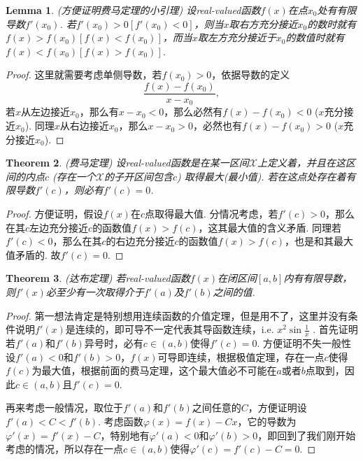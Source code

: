 \documentclass{article}
\newtheorem{theorem}{Theorem}[section]
\newtheorem{lemma}[theorem]{Lemma}
\begin{document}
\begin{lemma}
\rm {\color{red} (方便证明费马定理的小引理)} 设real-valued函数$f(x)$在点$x_0$处有有限导数$f'(x_0)$. 若$f'(x_0) > 0\left[ f'(x_0) < 0\right]$，则当$x$取右方充分接近$x_0$的数时就有$f(x) > f(x_0)\left[ f(x) < f(x_0)\right]$，而当$x$取左方充分接近于$x_0$的数值时就有$f(x) < f(x_0)\left[ f(x) > f(x_0)\right]$.
\end{lemma}

\begin{proof}
{\color{blue}这里就需要考虑单侧导数}，若$f(x_0) > 0$，依据导数的定义
$$
\frac{f(x) - f(x_0)}{x - x_0},
$$
若$x$从左边接近$x_0$，那么有$x-x_0  < 0$，那么必然有$f(x)-f(x_0) < 0$ ($x$充分接近$x_0$). 同理$x$从右边接近$x_0$，那么$x- x_0 > 0$，必然也有$f(x)-f(x_0) > 0$ ($x$充分接近$x_0$).
\end{proof}

\begin{theorem}
\rm {\color{red} (费马定理)} 设real-valued函数是在某一区间$\mathcal{X}$上定义着，并且在这区间的内点$c$ (存在一个$\mathcal{X}$的子开区间包含$c$) 取得最大(最小值). 若在这点处存在着有限导数$f'(c)$，则必有$f'(c) = 0$.
\end{theorem}

\begin{proof}
方便证明，假设$f(x)$在$c$点取得最大值. 分情况考虑，若$f'(c) > 0$，那么在其$c$左边充分接近$c$的函数值$f(x) > f(c)$，这其最大值的含义矛盾. 同理若$f'(c) < 0$，那么在其$c$的右边充分接近$c$的函数值$f(x) > f(c)$，也是和其最大值矛盾的. 故$f'(c) = 0$.
\end{proof}

\begin{theorem}
\rm {\color{red} (达布定理)} 若real-valued函数$f(x)$在闭区间$[a,b]$内有有限导数，则$f'(x)$必至少有一次取得介于$f'(a)$及$f'(b)$之间的值.
\end{theorem}

\begin{proof}
{\color{blue} 第一想法肯定是特别想用连续函数的介值定理，但是用不了，这里并没有条件说明$f'(x)$是连续的}，即{\color{red}可导不一定代表其导函数连续}，i.e. $x^2 \sin\frac{1}{x}$ . 首先证明若$f'(a)$和$f'(b)$异号时，必有$c \in (a,b)$使得$f'(c)=0$. 方便证明不失一般性设$f'(a) < 0$和$f'(b) > 0$，$f(x)$可导即连续，根据{\color{red}极值定理}，存在一点$c$使得$f(c)$为最大值，根据前面的{\color{red}费马定理}，这个最大值必不可能在$a$或者$b$点取到，因此$c \in (a,b)$且$f'(c)=0$.

再来考虑一般情况，取位于$f'(a)$和$f'(b)$之间任意的$C$，方便证明设$f'(a) < C < f'(b)$. 考虑函数$\varphi(x) = f(x) - Cx$，它的导数为$\varphi'(x) = f'(x) - C$，特别地有$\varphi'(a) < 0$和$\varphi'(b) > 0$，即回到了我们刚开始考虑的情况，所以存在一点$c \in (a,b)$使得$\varphi'(c) = f'(c) - C =0$.
\end{proof}
\end{document}
